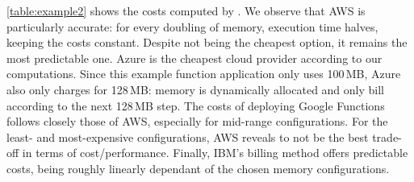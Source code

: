 \autoref{table:example2} shows the costs computed by \sys.
We observe that \gls{AWS} is particularly accurate: for every doubling of memory, execution time halves, keeping the costs constant.
Despite not being the cheapest option, it remains the most predictable one. 
Azure is the cheapest cloud provider according to our computations.
Since this example function application only uses 100\,\gls{MB}, Azure also only charges for 128\,\gls{MB}: memory is dynamically allocated and only bill according to the next 128\,MB step.
The costs of deploying Google Functions follows closely those of \gls{AWS}, especially for mid-range configurations.
For the least- and most-expensive configurations, AWS reveals to not be the best trade-off in terms of cost/performance.
Finally, IBM's billing method offers predictable costs, being roughly linearly dependant of the chosen memory configurations.

